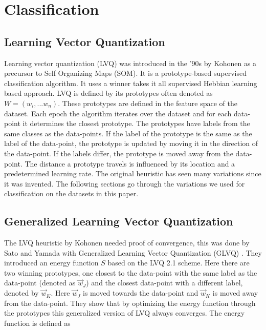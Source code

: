 \section{Classification}

\subsection{Learning Vector Quantization}

Learning vector quantization (LVQ) was introduced in the '90s by Kohonen \cite{kohonen} as a precursor to Self Organizing Maps (SOM). It is a prototype-based supervised classification algorithm. It uses a winner takes it all supervised Hebbian learning based approach. LVQ is defined by its prototypes often denoted as $W = (w_i , ... w_n)$. These prototypes are defined in the feature space of the dataset. Each epoch the algorithm iterates over the dataset and for each data-point it determines the closest prototype. The prototypes have labels from the same classes as the data-points. If the label of the prototype is the same as the label of the data-point, the prototype is updated by moving it in the direction of the data-point. If the labels differ, the prototype is moved away from the data-point. The distance a prototype travels is influenced by its location and a predetermined learning rate. The original heuristic has seen many variations since it was invented. The following sections go through the variations we used for classification on the datasets in this paper.

\subsection{Generalized Learning Vector Quantization}
\label{sssec:method:glvq}

The LVQ heuristic by Kohonen \cite{LVQ} needed proof of convergence, this was done by Sato and Yamada with Generalized Learning Vector Quantization (GLVQ) \cite{GLVQ}. They introduced an energy function $S$ based on the LVQ 2.1 scheme. Here there are two winning prototypes, one closest to the data-point with the same label as the data-point (denoted as $\vec{w}_J$) and the closest data-point with a different label, denoted by $\vec{w}_K$. Here $\vec{w}_J$ is moved towards the data-point and $\vec{w}_K$ is moved away from the data-point. They show that by optimizing the energy function through the prototypes this generalized version of LVQ always converges. The energy function is defined as 

